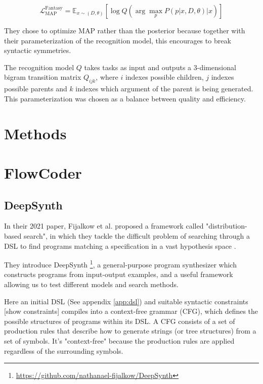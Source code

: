 \[
    \mathcal{L}_{\text{MAP}}^{\text{Fantasy}} = \mathbb{E}_{x \sim (D, \theta)} \left[ \log Q \left( \arg\max_{p} P(p|x, D, \theta) \Big\lvert x \right) \right]  
\]

They chose to optimize MAP rather than the posterior because together with their parameterization of the recognition model, this encourages to break syntactic symmetries.

The recognition model \(Q\) takes tasks as input and outputs a 3-dimensional bigram transition matrix \(Q_{ijk}\), where \(i\) indexes possible children, \(j\) indexes possible parents and \(k\) indexes which argument of the parent is being generated. This parameterization was chosen as a balance between quality and efficiency.







\section{Methods}
\section{FlowCoder}


\subsection{DeepSynth}

In their 2021 paper, Fijalkow et al. proposed a framework called "distribution-based search", in which they tackle the difficult problem of searching through a DSL to find programs matching a specification in a vast hypothesis space \cite{fijalkow_scaling_2021}.

They introduce DeepSynth \footnote{\url{https://github.com/nathanael-fijalkow/DeepSynth}}, a general-purpose program synthesizer which constructs programs from input-output examples, and a useful framework allowing us to test different models and search methods.

Here an initial DSL (See appendix \ref{app:dsl}) and suitable syntactic constraints [show constraints] compiles into a context-free grammar (CFG), which defines the possible structures of programs within its DSL. A CFG consists of a set of production rules that describe how to generate strings (or tree structures) from a set of symbols. It's "context-free" because the production rules are applied regardless of the surrounding symbols.

